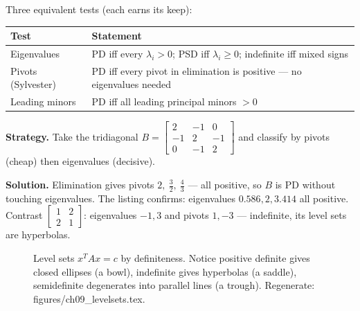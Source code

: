 Three equivalent tests (each earns its keep):

\begin{center}
\begin{tabularx}{\textwidth}{l>{\raggedright\arraybackslash}X}
\toprule
\textbf{Test} & \textbf{Statement}\\
\midrule
Eigenvalues & PD iff every $\lambda_i>0$; PSD iff $\lambda_i\ge0$;
indefinite iff mixed signs \\
Pivots (Sylvester) & PD iff every pivot in elimination is positive ---
no eigenvalues needed \\
Leading minors & PD iff all leading principal minors $>0$ \\
\bottomrule
\end{tabularx}
\end{center}

\begin{example}\label{ex:definite}
\textbf{Strategy.} Take the tridiagonal
$B=\begin{bmatrix}2&-1&0\\-1&2&-1\\0&-1&2\end{bmatrix}$ and classify by
pivots (cheap) then eigenvalues (decisive).

\textbf{Solution.} Elimination gives pivots $2,\ \tfrac32,\ \tfrac43$ ---
all positive, so $B$ is PD without touching eigenvalues. The listing
confirms: eigenvalues $0.586,2,3.414$ all positive. Contrast
$\begin{bmatrix}1&2\\2&1\end{bmatrix}$: eigenvalues $-1,3$ and pivots
$1,-3$ --- indefinite, its level sets are hyperbolas.
\end{example}

\begin{figure}[htbp]
\centering

\caption{Level sets $x^{T}Ax=c$ by definiteness. Notice positive definite
gives closed ellipses (a bowl), indefinite gives hyperbolas (a saddle),
semidefinite degenerates into parallel lines (a trough).
Regenerate: \ttfamily figures/ch09\_levelsets.tex.}
\label{fig:levelsets}
\end{figure}


